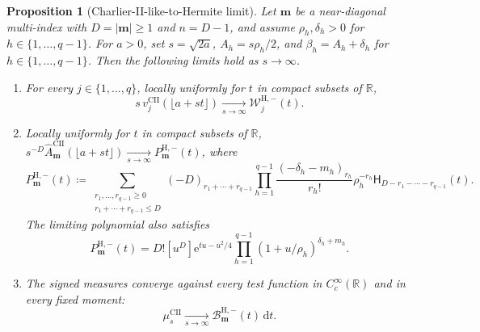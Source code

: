 \documentclass[10pt]{amsart}
\newcommand{\R}{\mathbb R}
\newcommand{\e}{\mathrm e}
\newcommand{\dd}{\,\mathrm d}
\newcommand{\mm}{\boldsymbol m}
\newcommand{\abs}[1]{\lvert#1\rvert}
\theoremstyle{plain}
\newtheorem{proposition}[theorem]{Proposition}
\theoremstyle{definition}
\theoremstyle{remark}
\begin{document}
\begin{proposition}[Charlier-II-like-to-Hermite limit]
\label{prop:CII-Hermite}
Let \(\mm\) be a near-diagonal multi-index with \(D=\abs\mm\ge1\) and
\(n=D-1\), and assume \(\rho_h,\delta_h>0\) for
\(h\in\{1,\ldots,q-1\}\). For \(a>0\), set
\(s=\sqrt{2a}\), \(A_h=s\rho_h/2\), and
\(\beta_h=A_h+\delta_h\) for \(h\in\{1,\ldots,q-1\}\). Then the following limits hold as
\(s\to\infty\).

\begin{enumerate}[label=\textnormal{(\roman*)}]
\item For every \(j\in\{1,\ldots,q\}\), locally uniformly for \(t\) in
compact subsets of \(\R\),
\begin{equation}
 s\,v_j^{\mathrm{CII}}(\lfloor a+st\rfloor)
 \xrightarrow[s\to\infty]{}\mathcal W_j^{\mathrm H,-}(t).
 \label{eq:CII-Hermite-rows}
\end{equation}

\item Locally uniformly for \(t\) in compact subsets of \(\R\),
\(s^{-D}\widehat A_{\mm}^{\mathrm{CII}}(\lfloor a+st\rfloor)
\xrightarrow[s\to\infty]{}P_{\mm}^{\mathrm H,-}(t)\), where
\begin{equation}
 P_{\mm}^{\mathrm H,-}(t)
 \coloneq\sum_{\substack{r_1,\ldots,r_{q-1}\ge0\\
                    r_1+\cdots+r_{q-1}\le D}}
 (-D)_{r_1+\cdots+r_{q-1}}
 \prod_{h=1}^{q-1}
 \frac{(-\delta_h-m_h)_{r_h}}{r_h!}
 \rho_h^{-r_h}
 \mathsf H_{D-r_1-\cdots-r_{q-1}}(t).
 \label{eq:CII-Hermite-A}
\end{equation}
The limiting polynomial also satisfies
\begin{equation}
 P_{\mm}^{\mathrm H,-}(t)
 =D![u^D]\e^{tu-u^2/4}
 \prod_{h=1}^{q-1}(1+u/\rho_h)^{\delta_h+m_h}.
 \label{eq:CII-Hermite-A-generating}
\end{equation}

\item The signed measures converge against every test function in
\(C_c^\infty(\R)\) and in every fixed moment:
\begin{equation}
 \mu_s^{\mathrm{CII}}\xrightarrow[s\to\infty]{}
 \mathcal B_{\mm}^{\mathrm H,-}(t)\dd t.
 \label{eq:CII-Hermite-B}
\end{equation}
\end{enumerate}
\end{proposition}
\end{document}
